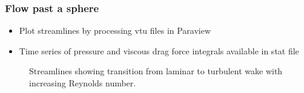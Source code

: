 \begin{frame}
    \frametitle{Flow past a sphere}
\begin{itemize}
\item Plot streamlines by processing vtu files in Paraview
\item Time series of pressure and viscous drag force integrals available in stat file
\end{itemize}
\begin{figure}
\centering
{}
\caption{Streamlines showing transition from laminar to turbulent wake with increasing Reynolds number.}
\end{figure}
\end{frame}

